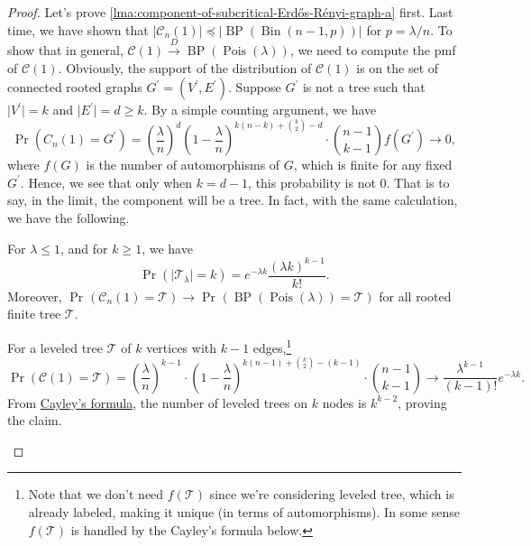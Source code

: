 \begin{proof}
	Let's prove \autoref{lma:component-of-subcritical-Erdős-Rényi-graph-a} first. Last time, we have shown that \(\lvert \mathcal{C} _n(1) \rvert \preceq \lvert \operatorname{BP} (\operatorname{Bin}(n-1, p) )\rvert \) for \(p = \lambda /n\). To show that in general, \(\mathcal{C} (1) \overset{D}{\to} \operatorname{BP}(\operatorname{Pois}(\lambda ) ) \), we need to compute the pmf of \(\mathcal{C} (1)\). Obviously, the support of the distribution of \(\mathcal{C} (1)\) is on the set of connected rooted graphs \(G^{\prime}  = (V^{\prime} , E^{\prime} )\). Suppose \(G^{\prime} \) is not a tree such that \(\lvert V^{\prime} \rvert = k\) and \(\lvert E^{\prime} \rvert = d \geq k\). By a simple counting argument, we have
	\[
		\Pr_{}(C_n(1) = G^{\prime} )
		= \left( \frac{\lambda }{n} \right) ^d \left( 1 - \frac{\lambda}{n} \right) ^{k (n-k) + \binom{k}{2} - d} \cdot \binom{n-1}{k-1} f(G^{\prime} )
		\to 0,
	\]
	where \(f(G)\) is the number of automorphisms of \(G\), which is finite for any fixed \(G^{\prime} \). Hence, we see that only when \(k = d-1\), this probability is not \(0\). That is to say, in the limit, the component will be a tree. In fact, with the same calculation, we have the following.

	\begin{claim}
		For \(\lambda \leq 1\), and for \(k \geq 1\), we have
		\[
			\Pr_{}(\lvert \mathcal{T} _\lambda \rvert = k)
			= e^{-\lambda k} \frac{(\lambda k)^{k-1}}{k!}.
		\]
		Moreover, \(\Pr_{}(\mathcal{C} _n(1) = \mathcal{T} ) \to \Pr_{}(\operatorname{BP}(\operatorname{Pois}(\lambda ) ) = \mathcal{T} ) \) for all rooted finite tree \(\mathcal{T} \).
	\end{claim}
	\begin{explanation}
		For a leveled tree \(\mathcal{T} \) of \(k\) vertices with \(k-1\) edges,\footnote{Note that we don't need \(f(\mathcal{T} )\) since we're considering leveled tree, which is already labeled, making it unique (in terms of automorphisms). In some sense \(f(\mathcal{T} )\) is handled by the Cayley's formula below.}
		\[
			\Pr_{}(\mathcal{C} (1) = \mathcal{T} )
			= \left( \frac{\lambda}{n} \right) ^{k-1} \cdot \left( 1 - \frac{\lambda}{n} \right) ^{k(n-1) + \binom{k}{2}  - (k-1)} \cdot \binom{n-1}{k-1}
			\to \frac{\lambda ^{k-1}}{(k-1)!} e^{-\lambda k}.
		\]
		From \hyperref[thm:Cayley-formula]{Cayley's formula}, the number of leveled trees on \(k\) nodes is \(k^{k-2}\), proving the claim.
	\end{explanation}


\end{proof}
